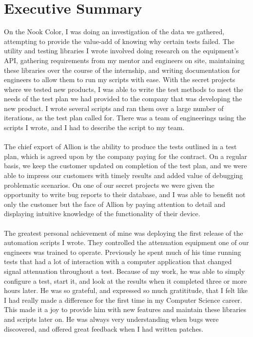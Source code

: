 \documentclass{article}
\begin{document}
\section*{Executive Summary}
On the Nook Color, I was doing an investigation of the data we gathered,
attempting to provide the value-add of knowing why certain tests failed.
The utility and testing libraries I wrote involved doing research on the
equipment's API, gathering requirements from my mentor and engineers on site,
maintaining these libraries over the course of the internship, and writing
documentation for engineers to allow them to run my scripts with ease.
With the secret projects where we tested new products, I was able to write the
test methods to meet the needs of the test plan we had provided to the company
that was developing the new product. I wrote several scripts and ran them over
a large number of iterations, as the test plan called for. There was a team of
engineerings using the scripts I wrote, and I had to describe the script to my
team.\\
\\
The chief export of Allion is the ability to produce the tests outlined in a
test plan, which is agreed upon by the company paying for the contract. On a
regular basis, we keep the customer updated on completion of the test plan, and
we were able to impress our customers with timely results and added value of
debugging problematic scenarios. On one of our secret projects we were given the
opportunity to write bug reports to their database, and I was able to benefit
not only the customer but the face of Allion by paying attention to detail and
displaying intuitive knowledge of the functionality of their device.\\
\\
The greatest personal achievement of mine was deploying the first release of the
automation scripts I wrote. They controlled the attenuation equipment one of our
engineers was trained to operate. Previously he spent much of his time running
tests that had a lot of interaction with a computer application that changed
signal attenuation throughout a test. Because of my work, he was able to simply
configure a test, start it, and look at the results when it completed three or
more hours later. He was so grateful, and expressed so much gratititude, that I
felt like I had really made a difference for the first time in my Computer
Science career. This made it a joy to provide him with new features and maintain
these libraries and scripts later on. He was always very understanding when bugs
were discovered, and offered great feedback when I had written patches.
\end{document}
